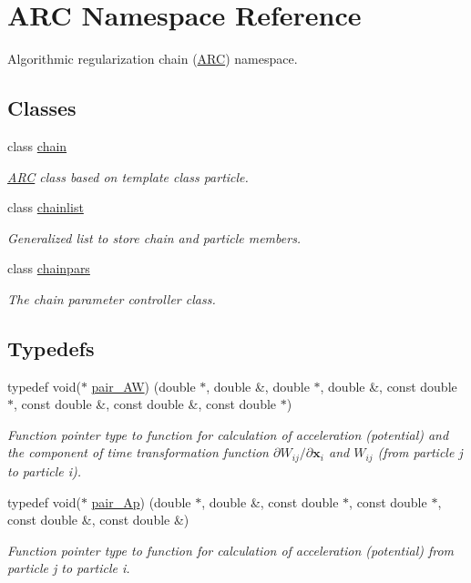 \hypertarget{namespaceARC}{}\section{A\+RC Namespace Reference}
\label{namespaceARC}


Algorithmic regularization chain (\hyperlink{namespaceARC}{A\+RC}) namespace.  


\subsection*{Classes}
\begin{DoxyCompactItemize}
\item 
class \hyperlink{classARC_1_1chain}{chain}
\begin{DoxyCompactList}\small\item\em \hyperlink{namespaceARC}{A\+RC} class based on template class particle. \end{DoxyCompactList}\item 
class \hyperlink{classARC_1_1chainlist}{chainlist}
\begin{DoxyCompactList}\small\item\em Generalized list to store chain and particle members. \end{DoxyCompactList}\item 
class \hyperlink{classARC_1_1chainpars}{chainpars}
\begin{DoxyCompactList}\small\item\em The chain parameter controller class. \end{DoxyCompactList}\end{DoxyCompactItemize}
\subsection*{Typedefs}
\begin{DoxyCompactItemize}
\item 
typedef void($\ast$ \hyperlink{namespaceARC_a5c4308ca4a8d0e0ff59fdce30f00274c}{pair\+\_\+\+AW}) (double $\ast$, double \&, double $\ast$, double \&, const double $\ast$, const double \&, const double \&, const double $\ast$)
\begin{DoxyCompactList}\small\item\em Function pointer type to function for calculation of acceleration (potential) and the component of time transformation function $\partial W_{ij}/\partial \mathbf{x}_i$ and $W_{ij}$ (from particle j to particle i). \end{DoxyCompactList}\item 
typedef void($\ast$ \hyperlink{namespaceARC_a819446c4644b3a3af7ef11574d0b55e0}{pair\+\_\+\+Ap}) (double $\ast$, double \&, const double $\ast$, const double $\ast$, const double \&, const double \&)
\begin{DoxyCompactList}\small\item\em Function pointer type to function for calculation of acceleration (potential) from particle j to particle i. \end{DoxyCompactList}\end{DoxyCompactItemize}
